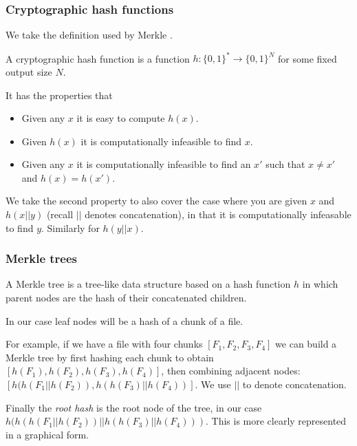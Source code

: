\documentclass[10pt,twoside,a4paper]{article}
\begin{document}


\subsubsection{Cryptographic hash functions} \label{crypto-hash}

We take the definition used by Merkle \cite{merkle-thesis}.

A cryptographic hash function is a function $h: \{0, 1\}^* \to \{0, 1\}^N$ for some fixed output size $N$.

It has the properties that
\begin{itemize}
\item Given any $x$ it is easy to compute $h(x)$.
\item Given $h(x)$ it is computationally infeasible to find $x$.
\item Given any $x$ it is computationally infeasible to find an $x'$ such that $x \neq x'$ and $h(x) = h(x')$.
\end{itemize}

We take the second property to also cover the case where you are given $x$ and $h(x || y)$ (recall $||$ denotes concatenation), in that it is computationally infeasable to find $y$.
Similarly for $h(y || x)$.

\subsubsection{Merkle trees}

A Merkle tree is a tree-like data structure based on a hash function $h$ in which parent nodes are the hash of their concatenated children.

In our case leaf nodes will be a hash of a chunk of a file.

For example, if we have a file with four chunks $[F_1, F_2, F_3, F_4]$ we can build a Merkle tree by first hashing each chunk to obtain
$[h(F_1), h(F_2), h(F_3), h(F_4)]$, then combining adjacent nodes:
$[h(h(F_1 || h(F_2)), h(h(F_3) || h(F_4))]$.
We use $||$ to denote concatenation.

Finally the {\em root hash} is the root node of the tree, in our case $h(h(h(F_1 || h(F_2)) || h(h(F_3) || h(F_4)))$.
This is more clearly represented in a graphical form.
\end{document}
